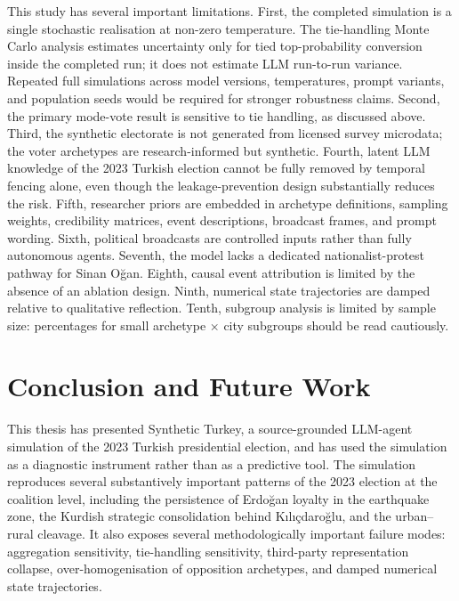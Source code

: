 \documentclass[12pt,a4paper]{report}
\begin{document}
This study has several important limitations. First, the completed simulation is a single stochastic realisation at non-zero temperature. The tie-handling Monte Carlo analysis estimates uncertainty only for tied top-probability conversion inside the completed run; it does not estimate LLM run-to-run variance. Repeated full simulations across model versions, temperatures, prompt variants, and population seeds would be required for stronger robustness claims. Second, the primary mode-vote result is sensitive to tie handling, as discussed above. Third, the synthetic electorate is not generated from licensed survey microdata; the voter archetypes are research-informed but synthetic. Fourth, latent LLM knowledge of the 2023 Turkish election cannot be fully removed by temporal fencing alone, even though the leakage-prevention design substantially reduces the risk. Fifth, researcher priors are embedded in archetype definitions, sampling weights, credibility matrices, event descriptions, broadcast frames, and prompt wording. Sixth, political broadcasts are controlled inputs rather than fully autonomous agents. Seventh, the model lacks a dedicated nationalist-protest pathway for Sinan Oğan. Eighth, causal event attribution is limited by the absence of an ablation design. Ninth, numerical state trajectories are damped relative to qualitative reflection. Tenth, subgroup analysis is limited by sample size: percentages for small archetype $\times$ city subgroups should be read cautiously.

\section{Conclusion and Future Work}
\label{sec:conclusion}

This thesis has presented Synthetic Turkey, a source-grounded LLM-agent simulation of the 2023 Turkish presidential election, and has used the simulation as a diagnostic instrument rather than as a predictive tool. The simulation reproduces several substantively important patterns of the 2023 election at the coalition level, including the persistence of Erdoğan loyalty in the earthquake zone, the Kurdish strategic consolidation behind Kılıçdaroğlu, and the urban--rural cleavage. It also exposes several methodologically important failure modes: aggregation sensitivity, tie-handling sensitivity, third-party representation collapse, over-homogenisation of opposition archetypes, and damped numerical state trajectories.
\end{document}
